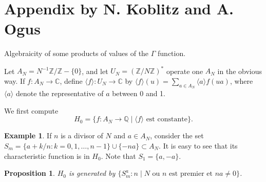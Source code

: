 \documentclass[12pt,a4paper]{article}
\theoremstyle{plain}
\newtheorem{proposition}[theorem]{Proposition}
\theoremstyle{definition}
\newtheorem{example}[definition]{Example}
\theoremstyle{remark}
\newcommand{\Q}{\mathbb{Q}}
\newcommand{\C}{\mathbb{C}}
\newcommand{\Z}{\mathbb{Z}}
\begin{document}
\section*{Appendix by N. Koblitz and A. Ogus}

Algebraicity of some products of values of the $\Gamma$ function.

Let $A_N = N^{-1}\Z/\Z - \{0\}$, and let $U_N = (\Z/N\Z)^*$ operate one $A_N$
in the obvious way. If $f: A_N \to \C$, define $\langle f \rangle: U_N \to \C$ by
$\langle f \rangle(u) = \sum_{a \in A_N} \langle a \rangle f(ua)$, where $\langle a \rangle$ denote the
representative of $a$ between 0 and 1.

We first compute
\[
H_0 = \{f: A_N \to \Q \mid \langle f \rangle \text{ est constante}\}.
\]

\begin{example}
If $n$ is a divisor of $N$ and $a \in A_N$, consider the set
$S_m = \{a + k/n: k = 0, 1, \ldots, n-1\} \cup \{-na\} \subset A_N$. It is easy to see
that its characteristic function is in $H_0$. Note that $S_1 = \{a, -a\}$.
\end{example}

\begin{proposition}
$H_0$ is generated by $\{S_m^a: n \mid N \text{ ou } n \text{ est premier et } na \neq 0\}$.
\end{proposition}
\end{document}
